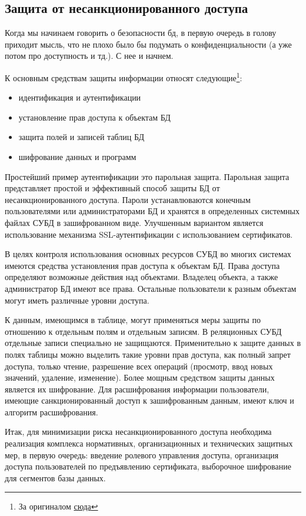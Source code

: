 \subsection{Защита от несанкционированного доступа}
Когда мы начинаем говорить о безопасности бд, в первую очередь в голову приходит мысль, что не плохо было бы подумать о конфиденциальности (а уже потом про доступность и тд.). С нее и начнем.

К основным средствам защиты информации относят следующие\footnote{За оригиналом \href{https://refdb.ru/look/2755914.html}{сюда}}:
\begin{itemize}
	\item идентификация и аутентификации
	\item установление прав доступа к объектам БД
	\item защита полей и записей таблиц БД
	\item шифрование данных и программ
\end{itemize}

Простейший пример аутентификации это парольная защита. Парольная защита представляет простой и эффективный способ защиты БД от несанкционированного доступа. Пароли устанавлюваются конечным пользователями или администраторами БД и хранятся в определенных системных файлах СУБД в зашифрованном виде. Улучшенным вариантом является использование механизма SSL-аутентификации с использованием сертификатов.

В целях контроля использования основных ресурсов СУБД во многих системах имеются средства установления прав доступа к объектам БД. Права доступа определяют возможные действия над объектами. Владелец объекта, а также администратор БД имеют все права. Остальные пользователи к разным объектам могут иметь различные уровни доступа.

К данным, имеющимся в таблице, могут применяться меры защиты по отношению к отдельным полям и отдельным записям. В реляционных СУБД отдельные записи специально не защищаются. Применительно к защите данных в полях таблицы можно выделить такие уровни прав доступа, как полный запрет доступа, только чтение, разрешение всех операций (просмотр, ввод новых значений, удаление, изменение). Более мощным средством защиты данных является их шифрование. Для расшифрования информации пользователи, имеющие санкционированный доступ к зашифрованным данным, имеют ключ и алгоритм расшифрования.

Итак, для минимизации риска несанкционированного доступа необходима реализация комплекса нормативных, организационных и технических защитных мер, в первую очередь: введение ролевого управления доступа, организация доступа пользователей по предъявлению сертификата, выборочное шифрование для сегментов базы данных.

